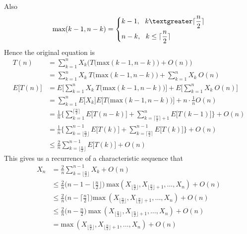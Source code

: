 \documentclass[15pt]{article}
\begin{document}
Also
\begin{equation}
\text{max}(k-1, n-k) = \left\{
\begin{aligned}
    &k-1,~~k \textgreater \lceil \frac{n}{2} \rceil \\
    &n-k, ~~k \leq \lceil \frac{n}{2} \rceil \\
\end{aligned}
\right.
\end{equation}
Hence the original equation is
\begin{equation}
\begin{aligned}
    T(n) &= \sum_{k=1}^{n} X_k \Bigg(T\bigg(\text{max}(k-1, n-k)\bigg) + O(n)\Bigg)\\
    &= \sum_{k=1}^n X_k~T\bigg(\text{max}(k-1, n-k)\bigg) + \sum_{k=1}^n X_k~O(n)\\
    E\bigg[T(n)\bigg] &= E\bigg[\sum_{k=1}^n X_k~T\bigg(\text{max}(k-1, n-k)\bigg) \bigg] + E\bigg[\sum_{k=1}^n X_k~O(n)\bigg]\\
    &= \sum_{k=1}^n E\bigg[X_k\bigg]E\bigg[T\bigg(\text{max}(k-1, n-k)\bigg) \bigg] + n \cdot \frac{1}{n} O(n) \\
    &= \frac{1}{n} \bigg\{ \sum_{k=1}^{\lceil \frac{n}{2} \rceil} E\bigg[T(n-k)\bigg] +\sum_{k=\lceil \frac{n}{2} \rceil + 1}^{n} E\bigg[T(k-1)\bigg] \bigg\} + O(n) \\
    &= \frac{1}{n} \bigg\{\sum_{k= \lfloor \frac{n}{2}\rfloor}^{n-1} E\bigg[T(k)\bigg] + \sum_{k=\lceil \frac{n}{2} \rceil}^{n-1} E\bigg[T(k)\bigg] \bigg\} + O(n) \\
    &\leq \frac{2}{n} \sum_{k=\lfloor \frac{n}{2} \rfloor}^{n-1} E\bigg[T(k)\bigg] + O(n)
\end{aligned}
\end{equation}
This gives us a recurrence of a characteristic sequence that
\begin{equation}
\begin{aligned}
    X_n &= \frac{2}{n} \sum_{k= \lfloor \frac{n}{2} \rfloor}^{n-1} X_k + O(n)\\
    &\leq \frac{2}{n} \bigg(n-1-\lfloor \frac{n}{2} \rfloor \bigg) ~\text{max}(X_{\lfloor \frac{n}{2} \rfloor}, X_{\lfloor \frac{n}{2} \rfloor + 1}, \dots, X_n) + O(n) \\
    &\leq \frac{2}{n}\bigg(n-\lceil \frac{n}{2} \rceil \bigg) \text{max}~(X_{\lfloor \frac{n}{2} \rfloor}, X_{\lfloor \frac{n}{2} \rfloor + 1}, \dots, X_n) + O(n) \\
    &\leq \frac{2}{n} \bigg(n-\frac{n}{2} \bigg)~\text{max}~(X_{\lfloor \frac{n}{2} \rfloor}, X_{\lfloor \frac{n}{2} \rfloor + 1}, \dots, X_n) + O(n) \\
    &= \text{max}~(X_{\lfloor \frac{n}{2} \rfloor}, X_{\lfloor \frac{n}{2} \rfloor + 1}, \dots, X_n) + O(n)
\end{aligned}
\end{equation}
\end{document}

